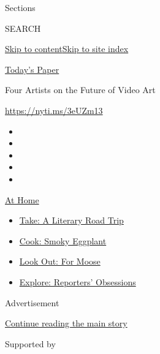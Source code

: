 Sections

SEARCH

\protect\hyperlink{site-content}{Skip to
content}\protect\hyperlink{site-index}{Skip to site index}

\href{https://myaccount.nytimes.com/auth/login?response_type=cookie\&client_id=vi}{}

\href{https://www.nytimes.com/section/todayspaper}{Today's Paper}

Four Artists on the Future of Video Art

\url{https://nyti.ms/3eUZm13}

\begin{itemize}
\item
\item
\item
\item
\item
\end{itemize}

\href{https://www.nytimes.com/spotlight/at-home?action=click\&pgtype=Article\&state=default\&region=TOP_BANNER\&context=at_home_menu}{At
Home}

\begin{itemize}
\tightlist
\item
  \href{https://www.nytimes.com/2020/07/28/books/time-for-a-literary-road-trip.html?action=click\&pgtype=Article\&state=default\&region=TOP_BANNER\&context=at_home_menu}{Take:
  A Literary Road Trip}
\item
  \href{https://www.nytimes.com/2020/07/29/magazine/bored-with-your-home-cooking-some-smoky-eggplant-will-fix-that.html?action=click\&pgtype=Article\&state=default\&region=TOP_BANNER\&context=at_home_menu}{Cook:
  Smoky Eggplant}
\item
  \href{https://www.nytimes.com/2020/07/27/travel/moose-michigan-isle-royale.html?action=click\&pgtype=Article\&state=default\&region=TOP_BANNER\&context=at_home_menu}{Look
  Out: For Moose}
\item
  \href{https://www.nytimes.com/interactive/2020/at-home/even-more-reporters-editors-diaries-lists-recommendations.html?action=click\&pgtype=Article\&state=default\&region=TOP_BANNER\&context=at_home_menu}{Explore:
  Reporters' Obsessions}
\end{itemize}

Advertisement

\protect\hyperlink{after-top}{Continue reading the main story}

Supported by

